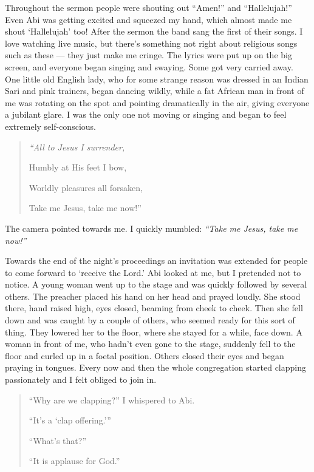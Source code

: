 \documentclass[12pt]{memoir}
\def\–{-\hskip0pt}
\begin{document}
Throughout the sermon people were shouting out “Amen!” and “Hallelujah!”
Even Abi was getting excited and squeezed my hand,
which almost made me shout ‘Hallelujah’ too!
After the sermon the band sang the first of their songs.
I love watching live music,
but there’s something not right about religious songs such as these —
they just make me cringe.
The lyrics were put up on the big screen,
and everyone began singing and swaying.
Some got very carried away.
One little old English lady,
who for some strange reason was dressed in an Indian Sari and pink trainers,
began dancing wildly, while a fat African man in front of me
was rotating on the spot and pointing dramatically in the air,
giving everyone a jubilant glare.
I was the only one not moving or singing
and began to feel extremely self\–conscious.

\begin{quote}
\itshape
“All to Jesus I surrender,

Humbly at His feet I bow,

Worldly pleasures all forsaken,

Take me Jesus, take me now!”
\end{quote}

The camera pointed towards me.
I quickly mumbled: \emph{“Take me Jesus, take me now!”}

Towards the end of the night’s proceedings an invitation was extended
for people to come forward to ‘receive the Lord.’
Abi looked at me, but I pretended not to notice.
A young woman went up to the stage and was quickly followed by several others.
The preacher placed his hand on her head and prayed loudly.
She stood there, hand raised high, eyes closed, beaming from cheek to cheek.
Then she fell down and was caught by a couple of others,
who seemed ready for this sort of thing.
They lowered her to the floor, where she stayed for a while, face down.
A woman in front of me, who hadn’t even gone to the stage,
suddenly fell to the floor and curled up in a foetal position.
Others closed their eyes and began praying in tongues.
Every now and then the whole congregation started clapping passionately
and I felt obliged to join in.

\begin{quote}
“Why are we clapping?” I whispered to Abi.

“It’s a ‘clap offering.’”

“What’s that?”

“It is applause for God.”
\end{quote}
\end{document}
